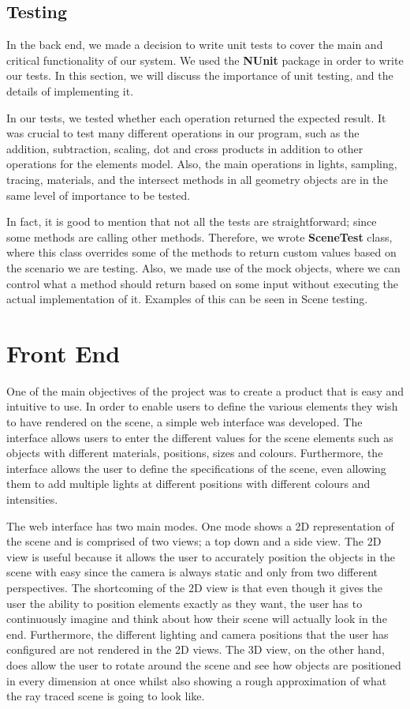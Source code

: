 \documentclass[a4paper]{report}
\begin{document}
	\subsection{Testing}\label{sec:backend-tests}
	In the back end, we made a decision to write unit tests to cover the main and critical functionality of our system. We used the \textbf{NUnit} package in order to write our tests. In this section, we will discuss the importance of unit testing, and the details of implementing it.\newline
	\par In our tests, we tested whether each operation returned the expected result. It was crucial to test many different operations in our program, such as the addition, subtraction, scaling, dot and cross products in addition to other operations for the elements model. Also, the main operations in lights, sampling, tracing, materials, and the intersect methods in all geometry objects are in the same level of importance to be tested.\newline
	\par In fact, it is good to mention that not all the tests are straightforward; since some methods are calling other methods. Therefore, we wrote \textbf{SceneTest} class, where this class overrides some of the methods to return custom values based on the scenario we are testing. Also, we made use of the mock objects, where we can control what a method should return based on some input without executing the actual implementation of it. Examples of this can be seen in Scene testing.
	\section{Front End}
	One of the main objectives of the project was to create a product that is easy and intuitive to use. In order to enable users to define the various elements they wish to have rendered on the scene, a simple web interface was developed. The interface allows users to enter the different values for the scene elements such as objects with different materials, positions, sizes and colours. Furthermore, the interface allows the user to define the specifications of the scene, even allowing them to add multiple lights at different positions with different colours and intensities.\newline 
	\par The web interface has two main modes. One mode shows a 2D representation of the scene and is comprised of two views; a top down and a side view. The 2D view is useful because it allows the user to accurately position the objects in the scene with easy since the camera is always static and only from two different perspectives. The shortcoming of the 2D view is that even though it gives the user the ability to position elements exactly as they want, the user has to continuously imagine and think about how their scene will actually look in the end. Furthermore, the different lighting and camera positions that the user has configured are not rendered in the 2D views. The 3D view, on the other hand, does allow the user to rotate around the scene and see how objects are positioned in every dimension at once whilst also showing a rough approximation of what the ray traced scene is going to look like. 
\end{document}

